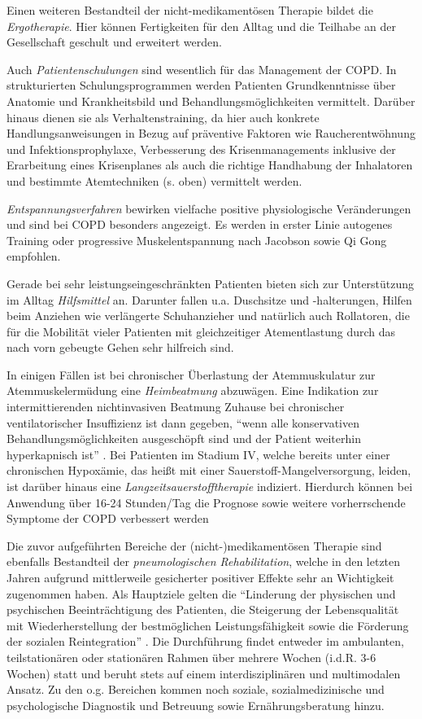 Einen weiteren Bestandteil der nicht-medikamentösen Therapie bildet die \emph{Ergotherapie}. Hier können Fertigkeiten für den Alltag und die Teilhabe an der Gesellschaft geschult und erweitert werden.

Auch \emph{Patientenschulungen} sind wesentlich für das Management der COPD. 
In strukturierten Schulungsprogrammen werden Patienten Grundkenntnisse über Anatomie und Krankheitsbild und Behandlungsmöglichkeiten vermittelt. Darüber hinaus dienen sie als Verhaltenstraining, da hier auch konkrete Handlungsanweisungen in Bezug auf präventive Faktoren wie Raucherentwöhnung und Infektionsprophylaxe, Verbesserung des Krisenmanagements inklusive der Erarbeitung eines Krisenplanes als auch die richtige Handhabung der Inhalatoren und bestimmte Atemtechniken (s. oben) vermittelt werden.

\emph{Entspannungsverfahren} bewirken vielfache positive physiologische Veränderungen und sind bei COPD besonders angezeigt. Es werden in erster Linie autogenes Training oder progressive Muskelentspannung nach Jacobson sowie Qi Gong empfohlen.

Gerade bei sehr leistungseingeschränkten Patienten bieten sich zur Unterstützung im Alltag \emph{Hilfsmittel} an. Darunter fallen u.a. Duschsitze und -halterungen, Hilfen beim Anziehen wie verlängerte Schuhanzieher und natürlich auch Rollatoren, die für die Mobilität vieler Patienten mit gleichzeitiger Atementlastung durch das nach vorn gebeugte Gehen sehr hilfreich sind.

In einigen Fällen ist bei chronischer Überlastung der Atemmuskulatur zur Atemmuskelermüdung eine \emph{Heimbeatmung} abzuwägen. Eine Indikation zur intermittierenden nichtinvasiven Beatmung Zuhause bei chronischer ventilatorischer Insuffizienz ist dann gegeben, "`wenn alle konservativen Behandlungsmöglichkeiten ausgeschöpft sind und der Patient weiterhin hyperkapnisch ist"' \autocite[e22]{vogelmeier2007}. Bei Patienten im Stadium IV, welche bereits unter einer chronischen Hypoxämie, das heißt mit einer Sauerstoff-Mangelversorgung, leiden, ist darüber hinaus eine \emph{Langzeitsauerstofftherapie} indiziert. Hierdurch können bei Anwendung über 16-24 Stunden/Tag die Prognose sowie weitere vorherrschende Symptome der COPD verbessert werden \autocite[vgl.][e22]{vogelmeier2007}

Die zuvor aufgeführten Bereiche der (nicht-)medikamentösen Therapie sind ebenfalls Bestandteil der \emph{pneumologischen Rehabilitation}, welche in den letzten Jahren aufgrund mittlerweile gesicherter positiver Effekte sehr an Wichtigkeit zugenommen haben. Als Hauptziele gelten die "`Linderung der physischen und psychischen Beeinträchtigung des Patienten, die Steigerung der Lebensqualität mit Wiederherstellung der bestmöglichen Leistungsfähigkeit sowie die Förderung der sozialen Reintegration"' \autocite[e21]{vogelmeier2007}. Die Durchführung findet entweder im ambulanten, teilstationären oder stationären Rahmen über mehrere Wochen (i.d.R. 3-6 Wochen) statt und beruht stets auf einem interdisziplinären und multimodalen Ansatz. Zu den o.g. Bereichen kommen noch soziale, sozialmedizinische und psychologische Diagnostik und Betreuung sowie Ernährungsberatung hinzu. 

